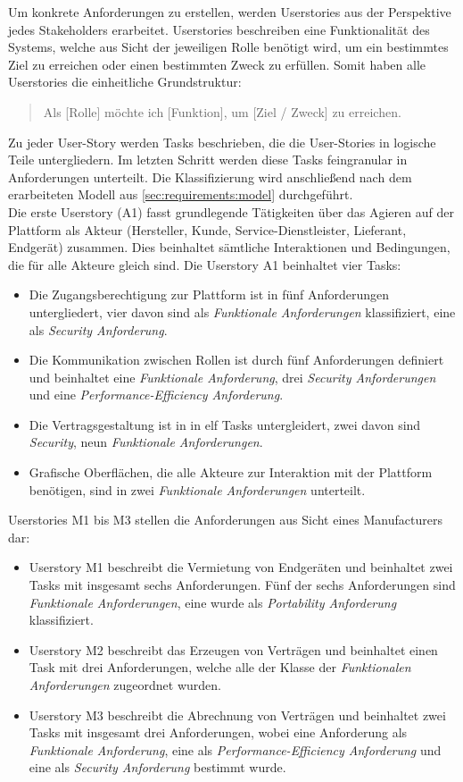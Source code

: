 Um konkrete Anforderungen zu erstellen, werden Userstories aus der Perspektive jedes Stakeholders erarbeitet. Userstories beschreiben eine Funktionalität des Systems, welche aus Sicht der jeweiligen Rolle benötigt wird, um ein bestimmtes Ziel zu erreichen oder einen bestimmten Zweck zu erfüllen. Somit haben alle Userstories die einheitliche Grundstruktur:\\
\begin{quote}
  \glqq Als [Rolle] möchte ich [Funktion], um [Ziel / Zweck] zu erreichen.\grqq
\end{quote}
Zu jeder User-Story werden Tasks beschrieben, die die User-Stories in logische Teile untergliedern. Im letzten Schritt werden diese Tasks feingranular in Anforderungen unterteilt. Die Klassifizierung wird anschließend nach dem erarbeiteten Modell aus \ref{sec:requirements:model} durchgeführt.\\

Die erste Userstory (A1) fasst grundlegende Tätigkeiten über das Agieren auf der Plattform als Akteur (Hersteller, Kunde, Service-Dienstleister, Lieferant, Endgerät) zusammen. Dies beinhaltet sämtliche Interaktionen und Bedingungen, die für alle Akteure gleich sind. Die Userstory A1 beinhaltet vier Tasks:
\begin{itemize}
  \item Die Zugangsberechtigung zur Plattform ist in fünf Anforderungen untergliedert, vier davon sind als \textit{Funktionale Anforderungen} klassifiziert, eine als \textit{Security Anforderung}.
  \item Die Kommunikation zwischen Rollen ist durch fünf Anforderungen definiert und beinhaltet eine \textit{Funktionale Anforderung}, drei \textit{Security Anforderungen} und eine \textit{Performance-Efficiency Anforderung}.
  \item Die Vertragsgestaltung ist in in elf Tasks untergleidert, zwei davon sind \textit{Security}, neun \textit{Funktionale Anforderungen}.
  \item Grafische Oberflächen, die alle Akteure zur Interaktion mit der Plattform benötigen, sind in zwei \textit{Funktionale Anforderungen} unterteilt.
\end{itemize}

Userstories M1 bis M3 stellen die Anforderungen aus Sicht eines Manufacturers dar:
\begin{itemize}
  \item Userstory M1 beschreibt die Vermietung von Endgeräten und beinhaltet zwei Tasks mit insgesamt sechs Anforderungen. Fünf der sechs Anforderungen sind \textit{Funktionale Anforderungen}, eine wurde als \textit{Portability Anforderung} klassifiziert.
  \item Userstory M2 beschreibt das Erzeugen von Verträgen und beinhaltet einen Task mit drei Anforderungen, welche alle der Klasse der \textit{Funktionalen Anforderungen} zugeordnet wurden.
  \item Userstory M3 beschreibt die Abrechnung von Verträgen und beinhaltet zwei Tasks mit insgesamt drei Anforderungen, wobei eine Anforderung als \textit{Funktionale Anforderung}, eine als \textit{Performance-Efficiency Anforderung} und eine als \textit{Security Anforderung} bestimmt wurde.
\end{itemize}

